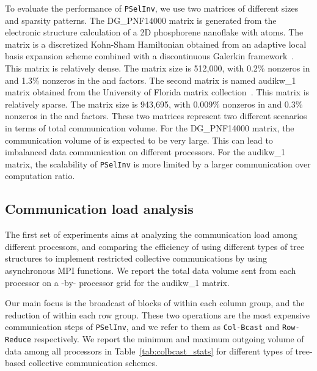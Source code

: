\documentclass{acm_proc_article-sp}
\newcommand{\pselinv}{\texttt{PSelInv}\xspace}
\newcommand{\colbcast}{\texttt{Col-Bcast}\xspace}
\newcommand{\rowreduce}{\texttt{Row-Reduce}\xspace}
\begin{document}
To evaluate the performance of \pselinv, we use two matrices of different 
sizes and sparsity patterns. The \linebreak DG\_PNF14000 matrix is generated
from the electronic structure calculation of a 2D phosphorene nanoflake with
 atoms. The matrix is a discretized Kohn-Sham Hamiltonian
obtained from an adaptive local basis expansion scheme combined with a
discontinuous Galerkin framework~\cite{LinLuYingE2012}. This
matrix is relatively dense. The matrix size is 512,000,  with 0.2\% nonzeros
in  and 1.3\% nonzeros in the  and  factors.  
The second matrix is named audikw\_1 matrix obtained from the University
of Florida matrix collection~\cite{FloridaMatrix}. This
matrix is relatively sparse. The matrix size is 943,695,
with 0.009\% nonzeros in  and 0.3\% nonzeros in the  and  factors.  
These two matrices represent two different scenarios in terms of total communication
volume.  For the DG\_PNF14000 matrix, the communication volume of is 
expected to be very large. This can lead to imbalanced data communication 
on different processors.  For the audikw\_1 matrix, the scalability of 
\pselinv is more limited by a larger communication over computation 
ratio.  




\subsection{Communication load analysis}

The first set of experiments aims at analyzing the communication load
among different processors, and comparing the efficiency of using 
different types of
tree structures to implement restricted collective communications
by using asynchronous MPI functions. We report the total data volume sent
from each processor on a -by- processor grid 
for the audikw\_1 matrix.

Our main focus is the broadcast of blocks of 
within each column group, and the reduction of
 within each row group. 
These two operations are the most expensive communication steps
of \pselinv, and we refer to them as \colbcast and \rowreduce respectively.
We report the minimum and maximum outgoing volume of data among 
all processors in Table~\ref{tab:colbcast_stats} for different types of
tree-based collective communication schemes.
\end{document}
